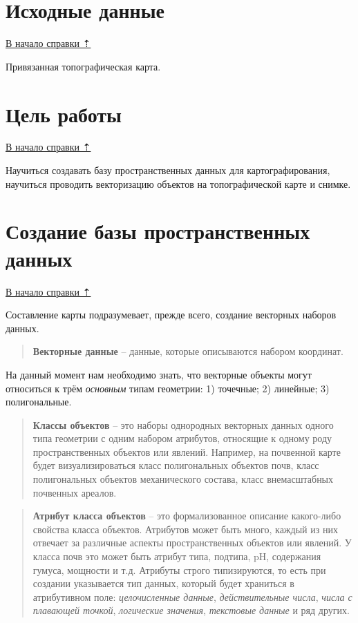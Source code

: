 \documentclass[
  12pt,
]{book}
\begin{document}
\section{Исходные данные}\label{digitize-initial}

\hyperref[digitize]{В начало справки ⇡}

Привязанная топографическая карта.

\section{Цель работы}\label{digitize-task}

\hyperref[digitize]{В начало справки ⇡}

Научиться создавать базу пространственных данных для картографирования, научиться проводить векторизацию объектов на топографической карте и снимке.

\section{Создание базы пространственных данных}\label{digitize-database}

\hyperref[digitize]{В начало справки ⇡}

Составление карты подразумевает, прежде всего, создание векторных наборов данных.

\begin{quote}
\textbf{Векторные данные} -- данные, которые описываются набором координат.
\end{quote}

На данный момент нам необходимо знать, что векторные объекты могут относиться к трём \emph{основным} типам геометрии: 1) точечные; 2) линейные; 3) полигональные.

\begin{quote}
\textbf{Классы объектов} -- это наборы однородных векторных данных одного типа геометрии с одним набором атрибутов, относящие к одному роду пространственных объектов или явлений. Например, на почвенной карте будет визуализироваться класс полигональных объектов почв, класс полигональных объектов механического состава, класс внемасштабных почвенных ареалов.
\end{quote}

\begin{quote}
\textbf{Атрибут класса объектов} -- это формализованное описание какого-либо свойства класса объектов. Атрибутов может быть много, каждый из них отвечает за различные аспекты пространственных объектов или явлений. У класса почв это может быть атрибут типа, подтипа, pH, содержания гумуса, мощности и т.д. Атрибуты строго типизируются, то есть при создании указывается тип данных, который будет храниться в атрибутивном поле: \emph{целочисленные данные}, \emph{действительные числа}, \emph{числа с плавающей точкой}, \emph{логические значения}, \emph{текстовые данные} и ряд других.
\end{quote}
\end{document}
